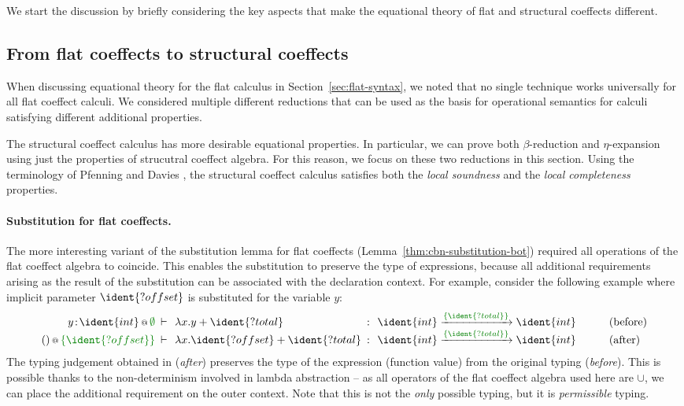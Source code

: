We start the discussion by briefly considering the key aspects
that make the equational theory of flat and structural coeffects different.

\subsection{From flat coeffects to structural coeffects}
\label{sec:struct-syntax-intro}

When discussing equational theory for the flat calculus in Section~\ref{sec:flat-syntax}, we 
noted that no single technique works universally for all flat coeffect calculi. We considered
multiple different reductions that can be used as the basis for operational semantics for
calculi satisfying different additional properties. 

The structural coeffect calculus has more desirable equational properties. In particular, 
we can prove both $\beta$-reduction and $\eta$-expansion using just the properties of strucutral 
coeffect algebra. For this reason, we focus on these two reductions in this section.
Using the terminology of Pfenning and Davies \cite{logic-modal-reconstruction},
the structural coeffect calculus satisfies both the \emph{local soundness} and 
the \emph{local completeness} properties.

\paragraph{Substitution for flat coeffects.} 
The more interesting variant of the substitution lemma for flat coeffects 
(Lemma~\ref{thm:cbn-substitution-bot}) required all operations of the flat coeffect algebra
to coincide. This enables the substitution to preserve the type of expressions, because all
additional requirements arising as the result of the substitution can be associated with the
declaration context. For example, consider the following example where implicit parameter 
$\ident{?offset}$ is substituted for the variable $y$:
%
\begin{equation*}
\begin{array}{rclcll}
 \coctx{y\!:\!\ident{int}}{\cclrd{\emptyset}} &\narrow{\vdash}& \lambda x.y + \ident{?total} &\narrow{:}&
   \ident{int} \xrightarrow{\cclrd{ \{ \ident{?total} \} }} \ident{int} & \qquad(\textnormal{before}) \\
\coctx{()}{\cclrd{ \{ \ident{?offset} \} }} &\narrow{\vdash}& \lambda x.\ident{?offset} + \ident{?total} &\narrow{:}&
  \ident{int} \xrightarrow{\cclrd{ \{ \ident{?total} \} }} \ident{int} & \qquad(\textnormal{after})
\end{array}  
\end{equation*}
%
The typing judgement obtained in (\emph{after}) preserves the type of the expression
(function value) from the original typing (\emph{before}). This is possible thanks to the
non-determinism involved in lambda abstraction -- as all operators of the flat coeffect
algebra used here are $\cup$, we can place the additional requirement on the outer context.
Note that this is not the \emph{only} possible typing, but it is \emph{permissible} typing.

